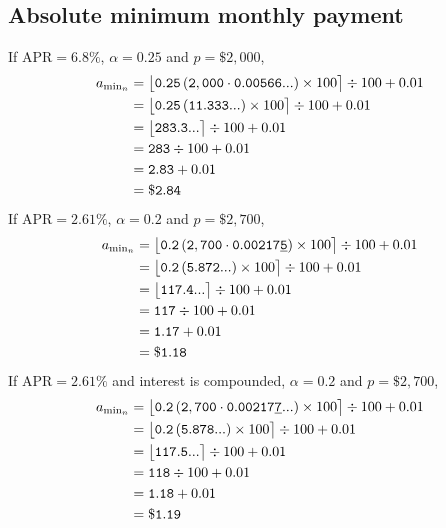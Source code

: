 \documentclass[12pt,letterpaper,oneside]{article}
\theoremstyle{remark} %
\begin{document}
	\subsection{Absolute minimum monthly payment}
	If $\mbox{APR}=6.8\%$, $\alpha=0.25$ and $p=\$2,000$,
	\begin{align*}
	a_{\rm{min_{\mathnormal{n}}}}&=\big\lfloor{\mathtt{0.25}\left(\mathtt{2,000}\cdot\mathtt{0.00566...}\right)\times 100}\big\rceil\div 100+0.01\\
	&=\big\lfloor{\mathtt{0.25}\left(\mathtt{11.333...}\right)\times 100}\big\rceil\div 100+0.01\\
	&=\big\lfloor{\mathtt{283.3...}}\big\rceil\div 100+0.01\\
	&=\mathtt{283}\div 100+0.01\\
	&=\mathtt{2.83}+0.01\\
	&=\mathtt{\$2.84}\\
	\end{align*}
	\newpage
	If $\mbox{APR}=2.61\%$, $\alpha=0.2$ and $p=\$2,700$,
	\begin{align*}
	a_{\rm{min_{\mathnormal{n}}}}&=\big\lfloor{\mathtt{0.2}\left(\mathtt{2,700}\cdot\mathtt{0.00217\underline{5}}\right)\times 100}\big\rceil\div 100+0.01\\
	&=\big\lfloor{\mathtt{0.2}\left(\mathtt{5.872...}\right)\times 100}\big\rceil\div 100+0.01\\
	&=\big\lfloor{\mathtt{117.4...}}\big\rceil\div 100+0.01\\
	&=\mathtt{117}\div 100+0.01\\
	&=\mathtt{1.17}+0.01\\
	&=\mathtt{\$1.18}\\
	\end{align*}
	If $\mbox{APR}=2.61\%$ and interest is compounded, $\alpha=0.2$ and $p=\$2,700$,
	\begin{align*}
	a_{\rm{min_{\mathnormal{n}}}}&=\big\lfloor{\mathtt{0.2}\left(\mathtt{2,700}\cdot\mathtt{0.00217\underline{7}...}\right)\times 100}\big\rceil\div 100+0.01\\
	&=\big\lfloor{\mathtt{0.2}\left(\mathtt{5.878...}\right)\times 100}\big\rceil\div 100+0.01\\
	&=\big\lfloor{\mathtt{117.5...}}\big\rceil\div 100+0.01\\
	&=\mathtt{118}\div 100+0.01\\
	&=\mathtt{1.18}+0.01\\
	&=\mathtt{\$1.19}\\
	\end{align*}
\end{document}
